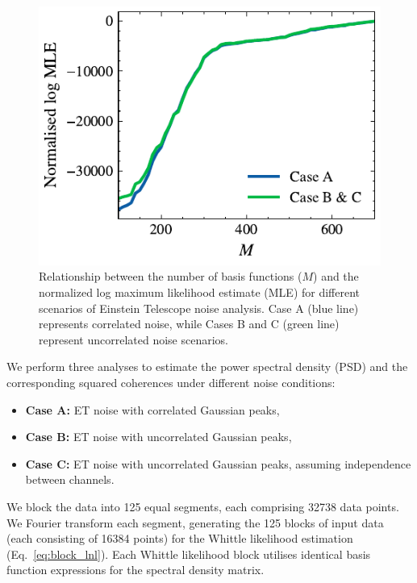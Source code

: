 \documentclass[%
 reprint,
 amsmath,amssymb,
 aps,
 nofootinbib,
]{revtex4-2}
\begin{document}
\begin{figure}[!t]
\centering
  \includegraphics[width=\columnwidth]{et_basis_fns.pdf}
  \caption{Relationship between the number of basis functions ($M$) and the normalized log maximum likelihood estimate (MLE) for different scenarios of Einstein Telescope noise analysis. Case A (blue line) represents correlated noise, while Cases B and C (green line) represent uncorrelated noise scenarios.
  }
  \label{et_corr_basis_funs_vs_mle}
\end{figure}


We perform three analyses to estimate the power spectral density (PSD) and the corresponding squared coherences under different noise conditions: 
\begin{itemize}
    \item[] \textbf{Case A:}  ET noise with correlated Gaussian peaks,
    \item[] \textbf{Case B:} ET noise with uncorrelated Gaussian peaks,
    \item[] \textbf{Case C:} ET noise with uncorrelated Gaussian peaks, assuming independence between channels.
\end{itemize}


We block the data into 125 equal segments, each comprising \num{32738} data points.
We Fourier transform each segment, generating the 125 blocks of input data (each consisting of \num{16 384} points) for the Whittle likelihood estimation (Eq.~\ref{eq:block_lnl}). 
Each Whittle likelihood block utilises identical basis function expressions for the spectral density matrix. 
\end{document}
